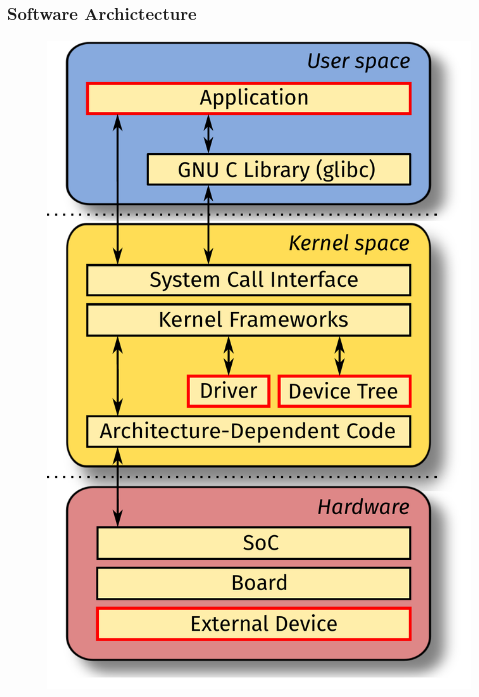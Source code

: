 \documentclass[aspectratio=169,usenames,dvipsnames]{beamer}
\begin{document}
\begin{frame}
  \frametitle{Software Archictecture}
  \begin{figure}
    \centering
    \includegraphics[scale=0.23]{images/architecture.pdf}
  \end{figure}
  \vspace*{-12mm}
\end{frame}
\end{document}
